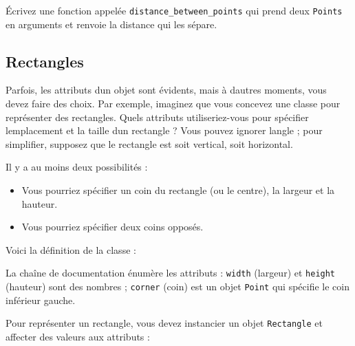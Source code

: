 Écrivez une fonction appelée \texttt{distance\_between\_points} qui
prend deux \texttt{Points} en arguments et renvoie la distance qui les
sépare.

\hypertarget{rectangles}{%
\subsection{Rectangles}\label{rectangles}}

Parfois, les attributs d\textquotesingle un objet sont évidents, mais à
d\textquotesingle autres moments, vous devez faire des choix. Par
exemple, imaginez que vous concevez une classe pour représenter des
rectangles. Quels attributs utiliseriez-vous pour spécifier
l\textquotesingle emplacement et la taille d\textquotesingle un
rectangle ? Vous pouvez ignorer l\textquotesingle angle ; pour
simplifier, supposez que le rectangle est soit vertical, soit
horizontal.

Il y a au moins deux possibilités :

\begin{itemize}
\tightlist
\item
  Vous pourriez spécifier un coin du rectangle (ou le centre), la
  largeur et la hauteur.
\item
  Vous pourriez spécifier deux coins opposés.
\end{itemize}

Voici la définition de la classe :

\begin{Shaded}
\begin{Highlighting}[]
\NormalTok{):}

\end{Highlighting}
\end{Shaded}

La chaîne de documentation énumère les attributs : \texttt{width}
(largeur) et \texttt{height} (hauteur) sont des nombres ;
\texttt{corner} (coin) est un objet \texttt{Point} qui spécifie le coin
inférieur gauche.

Pour représenter un rectangle, vous devez instancier un objet
\texttt{Rectangle} et affecter des valeurs aux attributs :

\begin{Shaded}
\begin{Highlighting}[]
\OperatorTok{=}
\OperatorTok{=} 
\OperatorTok{=} 
\OperatorTok{=}
\OperatorTok{=} 
\OperatorTok{=} 
\end{Highlighting}
\end{Shaded}

